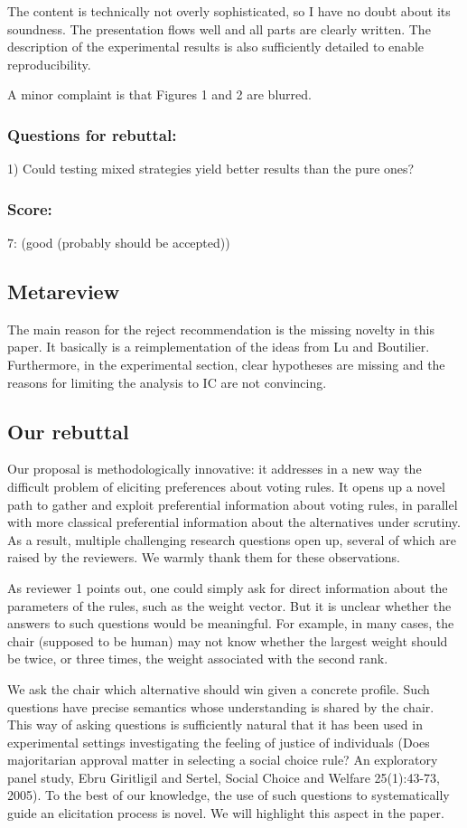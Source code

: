 \documentclass[version=3.21, pagesize, twoside=off, bibliography=totoc, DIV=calc, fontsize=12pt, a4paper]{scrartcl}
\begin{document}
The content is technically not overly sophisticated, so I have no doubt about its soundness.
The presentation flows well and all parts are clearly written. The description of the experimental results is also sufficiently detailed to enable reproducibility.

A minor complaint is that Figures 1 and 2 are blurred.
\subsubsection*{Questions for rebuttal:}
1) Could testing mixed strategies yield better results than the pure ones?
\subsubsection*{Score:}	
7: (good (probably should be accepted))

\subsection*{Metareview}
The main reason for the reject recommendation is the missing novelty in this paper. It basically is a reimplementation of the ideas from Lu and Boutilier. Furthermore, in the experimental section, clear hypotheses are missing and the reasons for limiting the analysis to IC are not convincing.

\subsection{Our rebuttal}
Our proposal is methodologically innovative: it addresses in a new way the difficult problem of eliciting preferences about voting rules. It opens up a novel path to gather and exploit preferential information about voting rules, in parallel with more classical preferential information about the alternatives under scrutiny. As a result, multiple challenging research questions open up, several of which are raised by the reviewers. We warmly thank them for these observations.

As reviewer 1 points out, one could simply ask for direct information about the parameters of the rules, such as the weight vector. But it is unclear whether the answers to such questions would be meaningful. For example, in many cases, the chair (supposed to be human) may not know whether the largest weight should be twice, or three times, the weight associated with the second rank.

We ask the chair which alternative should win given a concrete profile. Such questions have precise semantics whose understanding is shared by the chair. This way of asking questions is sufficiently natural that it has been used in experimental settings investigating the feeling of justice of individuals (Does majoritarian approval matter in selecting a social choice rule? An exploratory panel study, Ebru Giritligil and Sertel, Social Choice and Welfare 25(1):43-73, 2005). To the best of our knowledge, the use of such questions to systematically guide an elicitation process is novel. We will highlight this aspect in the paper.
\end{document}

